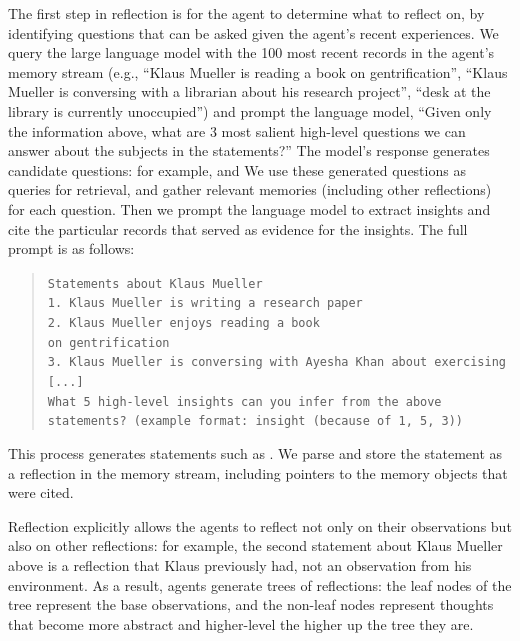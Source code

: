 The first step in reflection is for the agent to determine what to reflect on, by identifying questions that can be asked given the agent's recent experiences. We query the large language model with the 100 most recent records in the agent's memory stream (e.g., ``Klaus Mueller is reading a book on gentrification'', ``Klaus Mueller is conversing with a librarian about his research project'', ``desk at the library is currently unoccupied'') and prompt the language model, ``Given only the information above, what are 3 most salient high-level questions we can answer about the subjects in the statements?'' The model's response generates candidate questions: for example,  and  We use these generated questions as queries for retrieval, and gather relevant memories (including other reflections) for each question. Then we prompt the language model to extract insights and cite the particular records that served as evidence for the insights. The full prompt is as follows:
\begin{quote}
    {\small
    \texttt{Statements about Klaus Mueller \\
            1. Klaus Mueller is writing a research paper  \\
            2. Klaus Mueller enjoys reading a book \\on gentrification \\
            3. Klaus Mueller is conversing with Ayesha Khan about exercising [...]\\
            What 5 high-level insights can you infer from the above statements? (example format: insight (because of 1, 5, 3))
            }
    }
\end{quote}
This process generates statements such as . We parse and store the statement as a reflection in the memory stream, including pointers to the memory objects that were cited. 

Reflection explicitly allows the agents to reflect not only on their observations but also on other reflections: for example, the second statement about Klaus Mueller above is a reflection that Klaus previously had, not an observation from his environment. As a result, agents generate trees of reflections: the leaf nodes of the tree represent the base observations, and the non-leaf nodes represent thoughts that become more abstract and higher-level the higher up the tree they are.

